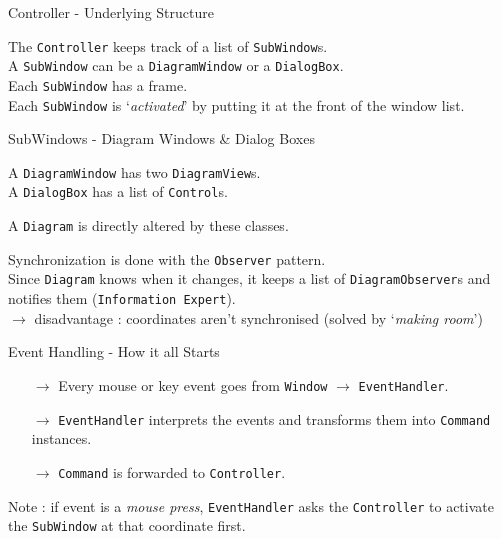 \documentclass[10pt]{beamer}
\begin{document}
\begin{frame}[fragile]{Controller - Underlying Structure}
	\begin{center}
	The \texttt{Controller} keeps track of a list of \texttt{SubWindow}s.
	\\ A \texttt{SubWindow} can be a \texttt{DiagramWindow} or a \texttt{DialogBox}.
	\\ Each \texttt{SubWindow} has a frame.
	\\ Each \texttt{SubWindow} is `\textit{activated}' by putting it at the front of the window list.
	\end{center}
\end{frame}

\begin{frame}[fragile]{SubWindows - Diagram Windows \& Dialog Boxes}
	\begin{center}
	A \texttt{DiagramWindow} has two \texttt{DiagramView}s.
	\\A \texttt{DialogBox} has a list of \texttt{Control}s.
	
	\vspace{0.5cm}
	A \texttt{Diagram} is directly altered by these classes.
	
	\vspace{0.5cm}
	Synchronization is done with the \texttt{Observer} pattern. 
	\\ Since \texttt{Diagram} knows when it changes, it keeps a list of \texttt{DiagramObserver}s and notifies them (\texttt{Information Expert}).
	\\$\rightarrow$ disadvantage : coordinates aren't synchronised (solved by `\textit{making room}')
	\end{center}
\end{frame}

\begin{frame}[fragile]{Event Handling - How it all Starts}
	\begin{center}
	\begin{itemize}
	\item[$\rightarrow$] Every mouse or key event goes from \texttt{Window} $\rightarrow$ \texttt{EventHandler}.
	\item[$\rightarrow$] \texttt{EventHandler} interprets the events and transforms them into \texttt{Command} instances.
	\item[$\rightarrow$] \texttt{Command} is forwarded to \texttt{Controller}.
	\end{itemize}
	Note : if event is a \textit{mouse press}, \texttt{EventHandler} asks the \texttt{Controller} to activate the \texttt{SubWindow} at that coordinate first. 
	\end{center}
\end{frame}
\end{document}
